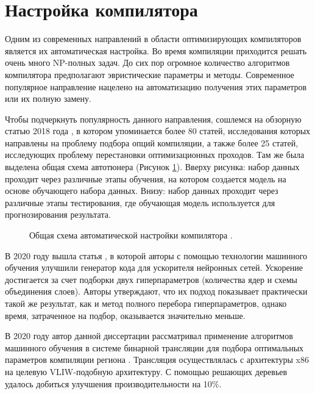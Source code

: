  
\section{Настройка компилятора} \label{pr:tuning}

Одним из современных направлений в области оптимизирующих компиляторов является их автоматическая настройка. Во время компиляции приходится решать очень много NP-полных задач. До сих пор огромное количество алгоритмов компилятора предполагают эвристические параметры и методы. Современное популярное направление нацелено на автоматизацию получения этих параметров или их полную замену\cite{leather2020machine}.

Чтобы подчеркнуть популярность данного направления, сошлемся на обзорную статью 2018 года \cite{ashouri2018survey}, в котором упоминается более 80 статей, исследования которых направлены на проблему подбора опций компиляции, а также более 25 статей, исследующих проблему перестановки оптимизационных проходов. Там же была выделена общая схема автотюнера (Рисунок \ref{partReview:ml_for_comp1}). Вверху рисунка: набор данных проходит через различные этапы обучения, на котором создается модель на основе обучающего набора данных. Внизу: набор данных проходит через различные этапы тестирования, где обучающая модель используется для прогнозирования результата.  

 \begin{figure}[htbp]
	\centering
	
	\caption{Общая схема автоматической настройки компилятора \cite{ashouri2018survey}.}
	\label{partReview:ml_for_comp1}
\end{figure}

В 2020 году вышла статья \cite{liu2020dlfusion}, в которой авторы с помощью технологии машинного обучения улучшили генератор кода для ускорителя нейронных сетей. Ускорение достигается за счет подборки двух гиперпараметров (количества ядер и схемы объединения слоев). Авторы утверждают, что их подход показывает практически такой же результат, как и метод полного перебора гиперпараметров, однако время, затраченное на подбор, оказывается значительно меньше. 


В 2020 году автор данной диссертации рассматривал применение алгоритмов машинного обучения в системе бинарной трансляции для подбора оптимальных параметров компиляции региона  \cite{confmiptml1}. Трансляция осуществлялась с архитектуры x86 на целевую VLIW-подобную архитектуру. С помощью решающих деревьев удалось добиться улучшения производительности на 10\%.



